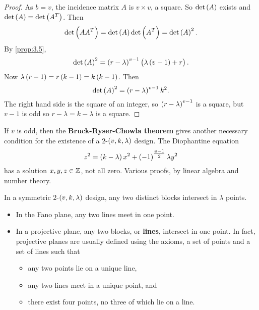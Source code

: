 \begin{proof}
As $ b = v $, the incidence matrix $ A $ is $ v \times v $, a square. So $ \det\br{A} $ exists and $ \det\br{A} = \det\br{A^T} $. Then
$$ \det\br{AA^T} = \det\br{A}\det\br{A^T} = \det\br{A}^2. $$
By \ref{prop:3.5},
$$ \det\br{A}^2 = \br{r - \lambda}^{v - 1}\br{\lambda\br{v - 1} + r}. $$
Now $ \lambda\br{r - 1} = r\br{k - 1} = k\br{k - 1} $. Then
$$ \det\br{A}^2 = \br{r - \lambda}^{v - 1}k^2. $$
The right hand side is the square of an integer, so $ \br{r - \lambda}^{v - 1} $ is a square, but $ v - 1 $ is odd so $ r - \lambda = k - \lambda $ is a square.
\end{proof}

\pagebreak

\begin{note*}
If $ v $ is odd, then the \textbf{Bruck-Ryser-Chowla theorem} gives another necessary condition for the existence of a $ 2 $-$ \br{v, k, \lambda} $ design. The Diophantine equation
$$ z^2 = \br{k - \lambda}x^2 + \br{-1}^{\tfrac{v - 1}{2}}\lambda y^2 $$
has a solution $ x, y, z \in \mathbb{Z} $, not all zero. Various proofs, by linear algebra and number theory.
\end{note*}

\begin{theorem}
\label{thm:3.9}
In a symmetric $ 2 $-$ \br{v, k, \lambda} $ design, any two distinct blocks intersect in $ \lambda $ points.
\end{theorem}

\begin{example*}
\hfill
\begin{itemize}
\item In the Fano plane, any two lines meet in one point.
\item In a projective plane, any two blocks, or \textbf{lines}, intersect in one point. In fact, projective planes are usually defined using the axioms, a set of points and a set of lines such that
\begin{itemize}
\item any two points lie on a unique line,
\item any two lines meet in a unique point, and
\item there exist four points, no three of which lie on a line.
\end{itemize}
\end{itemize}
\end{example*}


